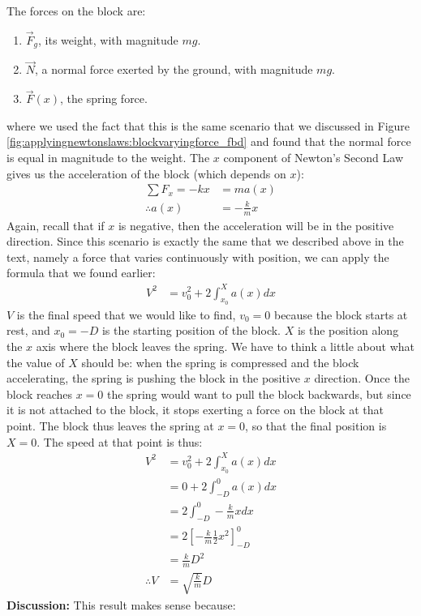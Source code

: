 \begin{example}
The forces on the block are:
\begin{enumerate}
\item $\vec F_g$, its weight, with magnitude $mg$.
\item $\vec N$, a normal force exerted by the ground, with magnitude $mg$.
\item $\vec F(x)$, the spring force.
\end{enumerate}
where we used the fact that this is the same scenario that we discussed in Figure \ref{fig:applyingnewtonslaws:blockvaryingforce_fbd} and found that the normal force is equal in magnitude to the weight. The $x$ component of Newton's Second Law gives us the acceleration of the block (which depends on $x$):
\begin{align*}
\sum F_x = -kx &= ma(x)\\
\therefore a(x)&=-\frac{k}{m}x
\end{align*}
Again, recall that if $x$ is negative, then the acceleration will be in the positive direction. Since this scenario is exactly the same that we described above in the text, namely a force that varies continuously with position, we can apply the formula that we found earlier:
\begin{align*}
V^2 &= v_0^2 + 2\int_{x_0}^{X}a(x)dx
\end{align*}
$V$ is the final speed that we would like to find, $v_0=0$ because the block starts at rest, and $x_0=-D$ is the starting position of the block. $X$ is the position along the $x$ axis where the block leaves the spring. We have to think a little about what the value of $X$ should be: when the spring is compressed and the block accelerating, the spring is pushing the block in the positive $x$ direction. Once the block reaches $x=0$ the spring would want to pull the block backwards, but since it is not attached to the block, it stops exerting a force on the block at that point. The block thus leaves the spring at $x=0$, so that the final position is $X=0$. The speed at that point is thus:
\begin{align*}
V^2 &= v_0^2 + 2\int_{x_0}^{X}a(x)dx\\
&= 0 + 2\int_{-D}^{0}a(x)dx\\
&= 2\int_{-D}^{0}-\frac{k}{m}xdx\\
&= 2\left[ - \frac{k}{m}\frac{1}{2}x^2\right]_{-D}^{0}\\
&= \frac{k}{m}D^2\\
\therefore V &= \sqrt{\frac{k}{m}}D
\end{align*}
\textbf{Discussion:} This result makes sense because:

\end{example}
